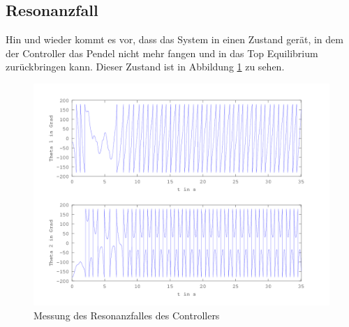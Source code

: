 \subsection{Resonanzfall}
Hin und wieder kommt es vor, dass das System in einen Zustand gerät, in dem der Controller das Pendel nicht mehr fangen und in das Top Equilibrium zurückbringen kann. Dieser Zustand ist in Abbildung \ref{fig.Watchdog-Plot} zu sehen. 

\begin{figure}[htbp]
	\centering
	\includegraphics[width=1.\textwidth]{Grafiken/Watchdog_lang.png}
	\caption{Messung des Resonanzfalles des Controllers}
	\label{fig.Watchdog-Plot}
\end{figure}


